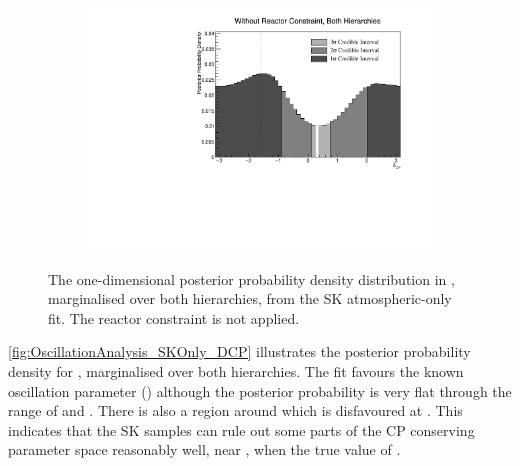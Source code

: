 \begin{figure}[h]
  \begin{subfigure}[t]{0.98\textwidth}
    \includegraphics[width=\textwidth, trim={0mm 0mm 0mm 0mm}, clip,page=1]{Figures/OA/SKOnlyFit/Contours_1D_dcp_BH_1_woRC_UnSmeared_CredibleInterval.pdf}
  \end{subfigure}
  \caption{The one-dimensional posterior probability density distribution in , marginalised over both hierarchies, from the SK atmospheric-only fit. The reactor constraint is not applied.}
  \label{fig:OscillationAnalysis_SKOnly_DCP}
\end{figure}

\autoref{fig:OscillationAnalysis_SKOnly_DCP} illustrates the posterior probability density for , marginalised over both hierarchies.
The fit favours the known oscillation parameter () although the posterior probability is very flat through the range of  and . There is also a region around  which is disfavoured at \quickmath{2\sigma}. This indicates that the SK samples can rule out some parts of the CP conserving parameter space reasonably well, near , when the true value of .

